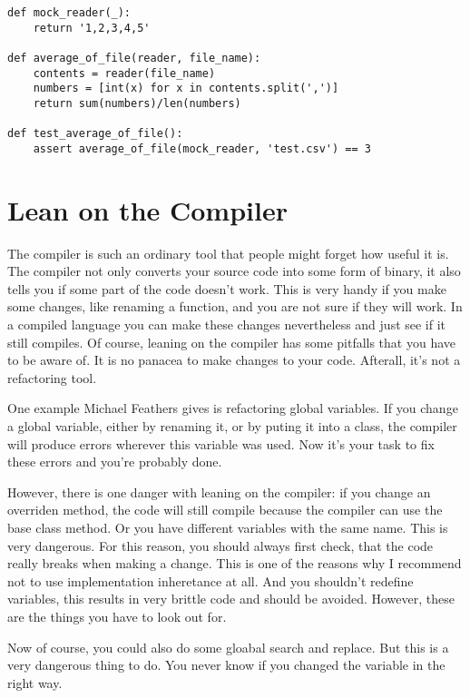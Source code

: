 \begin{programcode}{}
\begin{verbatim}
def mock_reader(_):
    return '1,2,3,4,5'

def average_of_file(reader, file_name):
    contents = reader(file_name)
    numbers = [int(x) for x in contents.split(',')]
    return sum(numbers)/len(numbers)

def test_average_of_file():
    assert average_of_file(mock_reader, 'test.csv') == 3
\end{verbatim}
\end{programcode}
 
\section{Lean on the Compiler}

The compiler is such an ordinary tool that people might forget how useful it is. The compiler not only converts your source code into some form of binary, it also tells you if some part of the code doesn't work. This is very handy if you make some changes, like renaming a function, and you are not sure if they will work. In a compiled language you can make these changes nevertheless and just see if it still compiles. Of course, leaning on the compiler has some pitfalls that you have to be aware of. It is no panacea to make changes to your code. Afterall, it's not a refactoring tool.

One example Michael Feathers gives is refactoring global variables. If you change a global variable, either by renaming it, or by puting it into a class, the compiler will produce errors wherever this variable was used. Now it's your task to fix these errors and you're probably done.

However, there is one danger with leaning on the compiler: if you change an overriden method, the code will still compile because the compiler can use the base class method. Or you have different variables with the same name. This is very dangerous. For this reason, you should always first check, that the code really breaks when making a change. This is one of the reasons why I recommend not to use implementation inheretance at all. And you shouldn't redefine variables, this results in very brittle code and should be avoided. However, these are the things you have to look out for. 

Now of course, you could also do some gloabal search and replace. But this is a very dangerous thing to do. You never know if you changed the variable in the right way.

